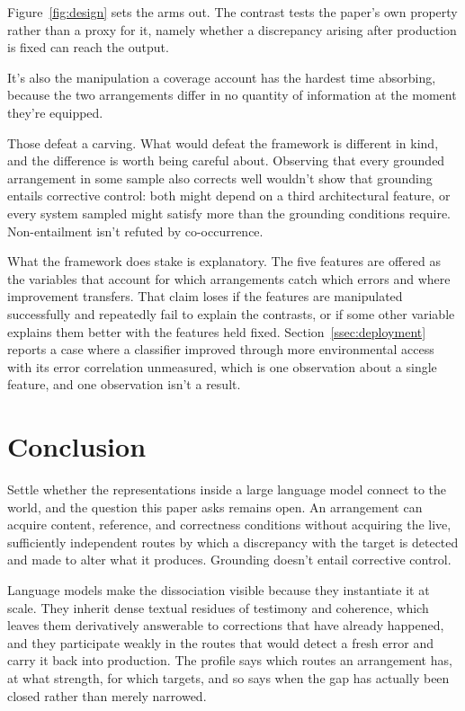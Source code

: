 \documentclass[12pt]{article}
\begin{document}
Figure~\ref{fig:design} sets the arms out. The contrast tests the paper's own property
rather than a proxy for it, namely whether a discrepancy arising after production is fixed
can reach the output.

 It's also the
manipulation a coverage account has the hardest time absorbing, because the two arrangements
differ in no quantity of information at the moment they're equipped.

Those defeat a carving. What would defeat the framework is different in kind, and the
difference is worth being careful about. Observing that every grounded arrangement in some
sample also corrects well wouldn't show that grounding entails corrective control: both
might depend on a third architectural feature, or every system sampled might satisfy more
than the grounding conditions require. Non-entailment isn't refuted by co-occurrence.

What the framework does stake is explanatory. The five features are offered as the
variables that account for which arrangements catch which errors and where improvement
transfers. That claim loses if the features are manipulated successfully and repeatedly
fail to explain the contrasts, or if some other variable explains them better with the
features held fixed. Section~\ref{ssec:deployment} reports a case where a classifier
improved through more environmental access with its error correlation unmeasured, which is
one observation about a single feature, and one observation isn't a result.

\section{Conclusion}\label{sec:conclusion}

Settle whether the representations inside a large language model connect to the world,
and the question this paper asks remains open. An arrangement can acquire content, reference, and correctness conditions
without acquiring the live, sufficiently independent routes by which a discrepancy with
the target is detected and made to alter what it produces. Grounding doesn't entail
corrective control.

Language models make the dissociation visible because they instantiate it at scale. They
inherit dense textual residues of testimony and coherence, which leaves them derivatively
answerable to corrections that have already happened, and they participate weakly in the
routes that would detect a fresh error and carry it back into production. The profile says which routes an arrangement has, at
what strength, for which targets, and so says when the gap has actually been closed rather
than merely narrowed.
\end{document}
